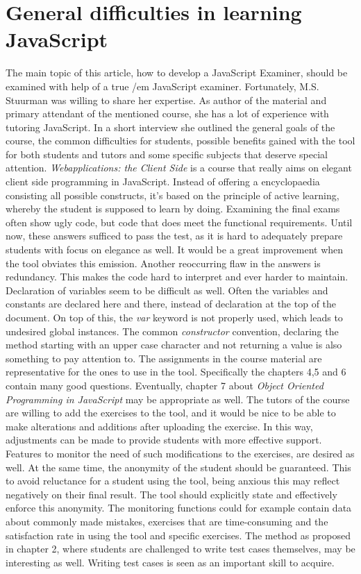 \documentclass{article}
\begin{document}
\section{General difficulties in learning JavaScript} 
The main topic of this article, how to develop a JavaScript Examiner, should be 
examined with help of a true {/em JavaScript examiner}. Fortunately, 
M.S. Stuurman was willing to share her expertise. As author of the
material and primary attendant of the mentioned course, she has a lot of
experience with tutoring JavaScript.  In a short interview she outlined the
general goals of the course, the common difficulties for students, possible 
benefits gained with the tool for both students and tutors and some specific 
subjects that deserve special attention.\newline
{\em Webapplications: the Client Side} is a course that really aims on elegant 
client side programming in JavaScript. Instead of offering a encyclopaedia
consisting all possible constructs, it's based on the principle of active
learning, whereby the student is supposed to learn by doing. \newline
Examining the final exams often show ugly code, but code that does meet 
the functional requirements. Until now, these answers sufficed to pass the test,
as it is hard to adequately prepare students with focus on elegance as well. It
would be a great improvement when the tool obviates this emission. Another 
reoccurring flaw in the answers is redundancy. This makes the code hard
to interpret and ever harder to maintain. Declaration of variables seem to be
difficult as well. Often the variables and constants are declared here and 
there, instead of
declaration at the top of the document. On top of this, the {\em var} keyword 
is not properly used, which leads to undesired global instances. The common
{\em constructor} convention, declaring the method starting with an upper case
character and not returning a value is also something to pay attention to. \newline
The assignments in the course material are representative for the ones to use 
in the tool. Specifically the chapters 4,5 and 6 contain many good questions. 
Eventually, chapter 7 about {\em Object Oriented Programming in JavaScript} may
be appropriate as well. 
The tutors of the course are willing to add the exercises to the tool, and it 
would be nice to be able to make alterations and additions after uploading the 
exercise. In this way, adjustments can be made to provide students with more
effective support. Features to monitor the need of such modifications to the 
exercises, are desired as well. At the same time, the anonymity of the student
should be guaranteed. This to avoid reluctance for a student using the tool, 
being anxious this may reflect negatively on their final result. The tool should
explicitly state and effectively enforce this anonymity. The monitoring
functions could for example contain data about commonly made mistakes,
exercises that are time-consuming and the satisfaction rate in using the tool
and specific exercises. The method as proposed in chapter 2, where students are
challenged to write test cases themselves, may be interesting as well. Writing
test cases is seen as an important skill to acquire. 
\end{document}
